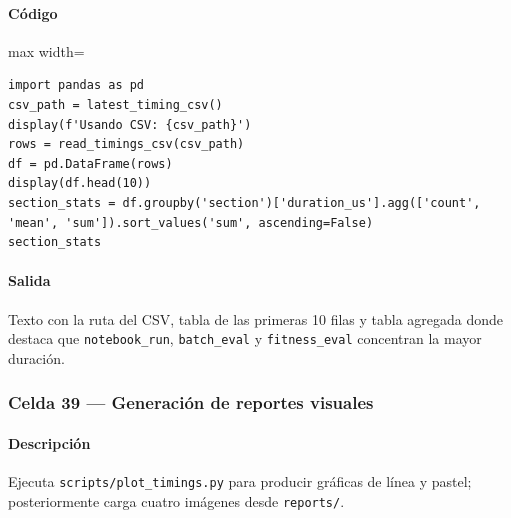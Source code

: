 \paragraph{Código}
\begin{listing}[H]
\caption{Celda 38: análisis preliminar de timings}
\label{lst:c04_cell38}
\begin{adjustbox}{max width=\textwidth}
\begin{minipage}{\textwidth}
\begin{verbatim}
import pandas as pd
csv_path = latest_timing_csv()
display(f'Usando CSV: {csv_path}')
rows = read_timings_csv(csv_path)
df = pd.DataFrame(rows)
display(df.head(10))
section_stats = df.groupby('section')['duration_us'].agg(['count', 'mean', 'sum']).sort_values('sum', ascending=False)
section_stats
\end{verbatim}
\end{minipage}
\end{adjustbox}
\end{listing}
\paragraph{Salida} Texto con la ruta del CSV, tabla de las primeras 10 filas y tabla agregada donde destaca que \texttt{notebook\_run}, \texttt{batch\_eval} y \texttt{fitness\_eval} concentran la mayor duración.

\subsubsection*{Celda 39 — Generación de reportes visuales}
\paragraph{Descripción} Ejecuta \texttt{scripts/plot\_timings.py} para producir gráficas de línea y pastel; posteriormente carga cuatro imágenes desde \texttt{reports/}.
